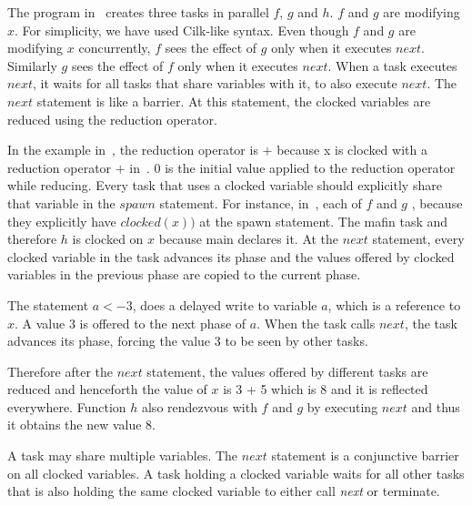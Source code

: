 \documentclass[10pt, conference, compsocconf]{IEEEtran}
\begin{document}
The program in~ creates three tasks
in parallel $f$, $g$ and $h$. $f$ and $g$ are
modifying $x$.
For simplicity, we have used Cilk\cite{blumofe1995cilk}-like syntax.
Even though $f$ and $g$ are modifying
$x$ concurrently, $f$ sees the effect of $g$ only
when it executes $next$. Similarly $g$ sees the effect
of $f$ only when it executes $next$.
When a task executes $next$, it waits for all tasks that
share variables with it, to also execute $next$. The $next$
statement is like a barrier. At this statement, the clocked variables are reduced
using the reduction operator.

In the example in~, the reduction operator is $+$ because x
is clocked  with a reduction operator $+$ in~.
$0$ is the initial value applied to the reduction operator while reducing.
 Every task that uses a clocked variable should explicitly share that
variable in the $spawn$ statement. 
 For instance, in~, each 
of $f$ and $g$ , because they explicitly have $clocked(x))$ at the
spawn statement. The mafin task and therefore $h$ is clocked on $x$ 
because main declares it.
At the $next$ statement, every clocked variable in the task advances its phase and the values offered
by clocked variables in the previous phase are copied to the current phase. 


The statement $a <- 3$, does a delayed write to variable $a$, 
which is a reference to $x$. A value $3$ is offered to the next phase of $a$.
 When the task calls $next$,
the task advances its phase, forcing the value $3$ to be 
seen by other tasks. 

Therefore after the $next$ statement, the values offered by different
tasks are reduced and henceforth the value of $x$ is 3 + 5 which is 8
and it is reflected everywhere.
Function $h$ also rendezvous with $f$ and $g$  by executing $next$
and thus it obtains the new value 8.

 A task may
share multiple variables.
The $next$ statement is a conjunctive barrier on all clocked variables. 
A task holding a clocked variable waits for all other tasks that is also
holding the same clocked variable to either call \emph{next} or terminate.
\end{document}
